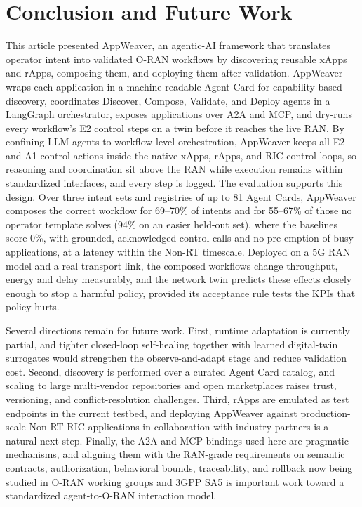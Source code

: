 \documentclass[conference]{IEEEtran}
\begin{document}
\section{Conclusion and Future Work}\label{sec:conclusion}
This article presented AppWeaver, an agentic-AI framework that translates operator intent into validated O-RAN workflows by discovering reusable xApps and rApps, composing them, and deploying them after validation. AppWeaver wraps each application in a machine-readable Agent Card for capability-based discovery, coordinates Discover, Compose, Validate, and Deploy agents in a LangGraph orchestrator, exposes applications over A2A and MCP, and dry-runs every workflow's E2 control steps on a twin before it reaches the live RAN. By confining LLM agents to workflow-level orchestration, AppWeaver keeps all E2 and A1 control actions inside the native xApps, rApps, and RIC control loops, so reasoning and coordination sit above the RAN while execution remains within standardized interfaces, and every step is logged. The evaluation supports this design. Over three intent sets and registries of up to 81 Agent Cards, AppWeaver composes the correct workflow for 69--70\% of intents and for 55--67\% of those no operator template solves (94\% on an easier held-out set), where the baselines score 0\%, with grounded, acknowledged control calls and no pre-emption of busy applications, at a latency within the Non-RT timescale. Deployed on a 5G RAN model and a real transport link, the composed workflows change throughput, energy and delay measurably, and the network twin predicts these effects closely enough to stop a harmful policy, provided its acceptance rule tests the KPIs that policy hurts.

Several directions remain for future work. First, runtime adaptation is currently partial, and tighter closed-loop self-healing together with learned digital-twin surrogates would strengthen the observe-and-adapt stage and reduce validation cost. Second, discovery is performed over a curated Agent Card catalog, and scaling to large multi-vendor repositories and open marketplaces raises trust, versioning, and conflict-resolution challenges. Third, rApps are emulated as test endpoints in the current testbed, and deploying AppWeaver against production-scale Non-RT RIC applications in collaboration with industry partners is a natural next step. Finally, the A2A and MCP bindings used here are pragmatic mechanisms, and aligning them with the RAN-grade requirements on semantic contracts, authorization, behavioral bounds, traceability, and rollback now being studied in O-RAN working groups and 3GPP SA5 is important work toward a standardized agent-to-O-RAN interaction model.



\end{document}
